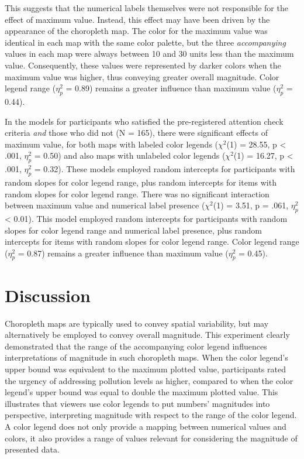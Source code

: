\documentclass[
]{interact}
\begin{document}
This suggests that the numerical labels themselves were not responsible
for the effect of maximum value. Instead, this effect may have been
driven by the appearance of the choropleth map. The color for the
maximum value was identical in each map with the same color palette, but
the three \emph{accompanying} values in each map were always between 10
and 30 units less than the maximum value. Consequently, these values
were represented by darker colors when the maximum value was higher,
thus conveying greater overall magnitude. Color legend range
(\(\eta_p^2\) = 0.89) remains a greater influence than maximum value
(\(\eta_p^2\) = 0.44).

In the models for participants who satisfied the pre-registered
attention check criteria \emph{and} those who did not (N = 165), there
were significant effects of maximum value, for both maps with labeled
color legends (\(\chi^2\)(1) = 28.55, p \textless{} .001, \(\eta_p^2\) =
0.50) and also maps with unlabeled color legends (\(\chi^2\)(1) = 16.27,
p \textless{} .001, \(\eta_p^2\) = 0.32). These models employed random
intercepts for participants with random slopes for color legend range,
plus random intercepts for items with random slopes for color legend
range. There was no significant interaction between maximum value and
numerical label presence (\(\chi^2\)(1) = 3.51, p = .061, \(\eta_p^2\)
\textless{} 0.01). This model employed random intercepts for
participants with random slopes for color legend range and numerical
label presence, plus random intercepts for items with random slopes for
color legend range. Color legend range (\(\eta_p^2\) = 0.87) remains a
greater influence than maximum value (\(\eta_p^2\) = 0.45).

\hypertarget{discussion}{%
\section{Discussion}\label{discussion}}

Choropleth maps are typically used to convey spatial variability, but
may alternatively be employed to convey overall magnitude. This
experiment clearly demonstrated that the range of the accompanying color
legend influences interpretations of magnitude in such choropleth maps.
When the color legend's upper bound was equivalent to the maximum
plotted value, participants rated the urgency of addressing pollution
levels as higher, compared to when the color legend's upper bound was
equal to double the maximum plotted value. This illustrates that viewers
use color legends to put numbers' magnitudes into perspective,
interpreting magnitude with respect to the range of the color legend. A
color legend does not only provide a mapping between numerical values
and colors, it also provides a range of values relevant for considering
the magnitude of presented data.
\end{document}
